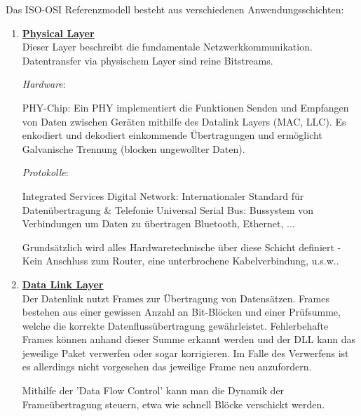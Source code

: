 \documentclass[11pt]{article}
\begin{document}
    Das ISO-OSI Referenzmodell besteht aus verschiedenen Anwendungsschichten:
    \begin{enumerate}
        \item \textbf{\underline{Physical Layer}}\\
        Dieser Layer beschreibt die fundamentale Netzwerkkommunikation. Datentransfer via
        physischem Layer sind reine Bitstreams.

        \emph{Hardware}:
        \begin{addmargin}[1em]{1em}
            PHY-Chip: Ein PHY implementiert die Funktionen Senden und Empfangen von Daten zwischen
            Geräten mithilfe des Datalink Layers (MAC, LLC). Es enkodiert und dekodiert einkommende
            Übertragungen und  ermöglicht Galvanische Trennung (blocken ungewollter Daten).
        \end{addmargin}

        \emph{Protokolle}:
        \begin{addmargin}[1em]{1em}
            Integrated Services Digital Network: Internationaler Standard für Datenübertragung \& Telefonie
            Universal Serial Bus: Bussystem von Verbindungen um Daten zu übertragen
            Bluetooth, Ethernet, ...
        \end{addmargin}

        Grundsätzlich wird alles Hardwaretechnische über diese Schicht definiert - Kein Anschluss zum Router,
        eine unterbrochene Kabelverbindung, u.s.w..

        \item \textbf{\underline{Data Link Layer}}\\
        Der Datenlink nutzt Frames zur Übertragung von Datensätzen. Frames bestehen aus einer gewissen Anzahl
        an Bit-Blöcken und einer Prüfsumme, welche die korrekte Datenflussübertragung gewährleistet.
        Fehlerbehafte Frames können anhand dieser Summe erkannt werden und der DLL kann das jeweilige Paket verwerfen
        oder sogar korrigieren.
        Im Falle des Verwerfens ist es allerdings nicht vorgesehen das jeweilige Frame neu anzufordern.

        Mithilfe der 'Data Flow Control' kann man die Dynamik der Frameübertragung steuern, etwa wie schnell
        Blöcke verschickt werden.


\end{enumerate}
\end{document}
